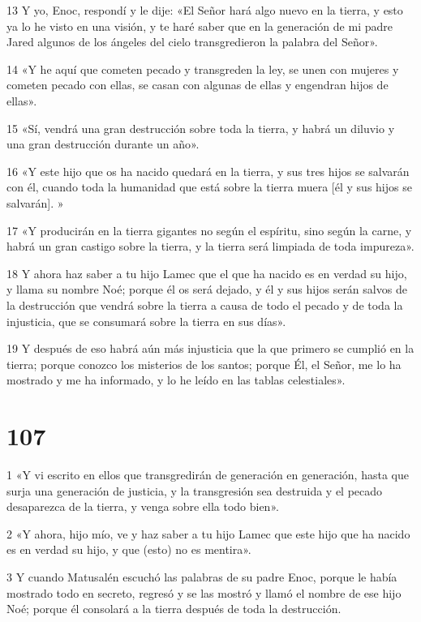 \par 13 Y yo, Enoc, respondí y le dije: «El Señor hará algo nuevo en la tierra, y esto ya lo he visto en una visión, y te haré saber que en la generación de mi padre Jared algunos de los ángeles del cielo transgredieron la palabra del Señor».
\par 14 «Y he aquí que cometen pecado y transgreden la ley, se unen con mujeres y cometen pecado con ellas, se casan con algunas de ellas y engendran hijos de ellas».
\par 15 «Sí, vendrá una gran destrucción sobre toda la tierra, y habrá un diluvio y una gran destrucción durante un año».
\par 16 «Y este hijo que os ha nacido quedará en la tierra, y sus tres hijos se salvarán con él, cuando toda la humanidad que está sobre la tierra muera [él y sus hijos se salvarán]. »
\par 17 «Y producirán en la tierra gigantes no según el espíritu, sino según la carne, y habrá un gran castigo sobre la tierra, y la tierra será limpiada de toda impureza».
\par 18 Y ahora haz saber a tu hijo Lamec que el que ha nacido es en verdad su hijo, y llama su nombre Noé; porque él os será dejado, y él y sus hijos serán salvos de la destrucción que vendrá sobre la tierra a causa de todo el pecado y de toda la injusticia, que se consumará sobre la tierra en sus días».
\par 19 Y después de eso habrá aún más injusticia que la que primero se cumplió en la tierra; porque conozco los misterios de los santos; porque Él, el Señor, me lo ha mostrado y me ha informado, y lo he leído en las tablas celestiales».

\chapter{107}

\par 1 «Y vi escrito en ellos que transgredirán de generación en generación, hasta que surja una generación de justicia, y la transgresión sea destruida y el pecado desaparezca de la tierra, y venga sobre ella todo bien».
\par 2 «Y ahora, hijo mío, ve y haz saber a tu hijo Lamec que este hijo que ha nacido es en verdad su hijo, y que (esto) no es mentira».
\par 3 Y cuando Matusalén escuchó las palabras de su padre Enoc, porque le había mostrado todo en secreto, regresó y se las mostró y llamó el nombre de ese hijo Noé; porque él consolará a la tierra después de toda la destrucción.

